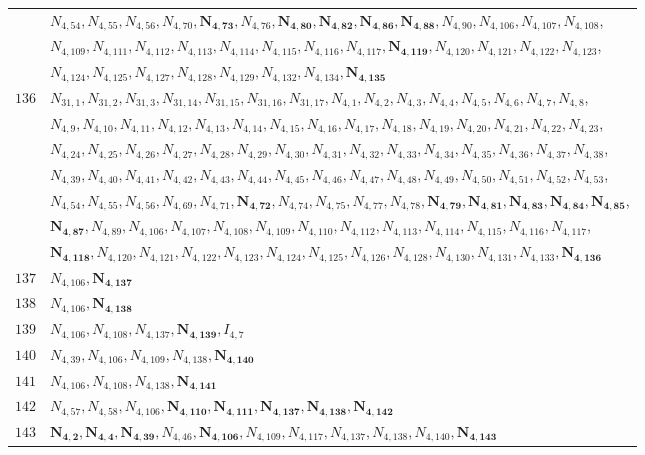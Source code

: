 \documentclass{amsart}
\theoremstyle{plain}
\theoremstyle{definition}
\theoremstyle{remark}
\begin{document}
{\begin{longtable}{ll}
& $N_{4,54}, N_{4,55}, N_{4,56}, N_{4,70}, \bm{N_{4,73}}, N_{4,76}, \bm{N_{4,80}}, \bm{N_{4,82}}, \bm{N_{4,86}}, \bm{N_{4,88}}, N_{4,90}, N_{4,106}, N_{4,107}, N_{4,108}$,\\ 
& $N_{4,109}, N_{4,111}, N_{4,112}, N_{4,113}, N_{4,114}, N_{4,115}, N_{4,116}, N_{4,117}, \bm{N_{4,119}}, N_{4,120}, N_{4,121}, N_{4,122}, N_{4,123}$,\\ 
& $N_{4,124}, N_{4,125}, N_{4,127}, N_{4,128}, N_{4,129}, N_{4,132}, N_{4,134}, \bm{N_{4,135}}$\\
$136$ & $N_{31,1}, N_{31,2}, N_{31,3}, N_{31,14}, N_{31,15}, N_{31,16}, N_{31,17}, N_{4,1}, N_{4,2}, N_{4,3}, N_{4,4}, N_{4,5}, N_{4,6}, N_{4,7}, N_{4,8}$,\\ 
& $N_{4,9}, N_{4,10}, N_{4,11}, N_{4,12}, N_{4,13}, N_{4,14}, N_{4,15}, N_{4,16}, N_{4,17}, N_{4,18}, N_{4,19}, N_{4,20}, N_{4,21}, N_{4,22}, N_{4,23}$,\\ 
& $N_{4,24}, N_{4,25}, N_{4,26}, N_{4,27}, N_{4,28}, N_{4,29}, N_{4,30}, N_{4,31}, N_{4,32}, N_{4,33}, N_{4,34}, N_{4,35}, N_{4,36}, N_{4,37}, N_{4,38}$,\\ 
& $N_{4,39}, N_{4,40}, N_{4,41}, N_{4,42}, N_{4,43}, N_{4,44}, N_{4,45}, N_{4,46}, N_{4,47}, N_{4,48}, N_{4,49}, N_{4,50}, N_{4,51}, N_{4,52}, N_{4,53}$,\\ 
& $N_{4,54}, N_{4,55}, N_{4,56}, N_{4,69}, N_{4,71}, \bm{N_{4,72}}, N_{4,74}, N_{4,75}, N_{4,77}, N_{4,78}, \bm{N_{4,79}}, \bm{N_{4,81}}, \bm{N_{4,83}}, \bm{N_{4,84}}, \bm{N_{4,85}}$,\\ 
& $\bm{N_{4,87}}, N_{4,89}, N_{4,106}, N_{4,107}, N_{4,108}, N_{4,109}, N_{4,110}, N_{4,112}, N_{4,113}, N_{4,114}, N_{4,115}, N_{4,116}, N_{4,117}$,\\ 
& $\bm{N_{4,118}}, N_{4,120}, N_{4,121}, N_{4,122}, N_{4,123}, N_{4,124}, N_{4,125}, N_{4,126}, N_{4,128}, N_{4,130}, N_{4,131}, N_{4,133}, \bm{N_{4,136}}$\\
$137$ & $N_{4,106}, \bm{N_{4,137}}$\\
$138$ & $N_{4,106}, \bm{N_{4,138}}$\\
$139$ & $N_{4,106}, N_{4,108}, N_{4,137}, \bm{N_{4,139}}, I_{4,7}$\\
$140$ & $N_{4,39}, N_{4,106}, N_{4,109}, N_{4,138}, \bm{N_{4,140}}$\\
$141$ & $N_{4,106}, N_{4,108}, N_{4,138}, \bm{N_{4,141}}$\\
$142$ & $N_{4,57}, N_{4,58}, N_{4,106}, \bm{N_{4,110}}, \bm{N_{4,111}}, \bm{N_{4,137}}, \bm{N_{4,138}}, \bm{N_{4,142}}$\\
$143$ & $\bm{N_{4,2}}, \bm{N_{4,4}}, \bm{N_{4,39}}, N_{4,46}, \bm{N_{4,106}}, N_{4,109}, N_{4,117}, N_{4,137}, N_{4,138}, N_{4,140}, \bm{N_{4,143}}$\\

\end{longtable}}
\end{document}
